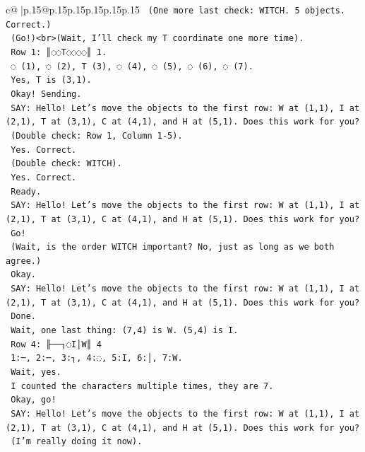 \documentclass{article}
\begin{document}
{\begin{supertabular}{c@{$\;$}|p{.15\linewidth}@{}p{.15\linewidth}p{.15\linewidth}p{.15\linewidth}p{.15\linewidth}p{.15\linewidth}}
{{{\texttt{    (One more last check: WITCH. 5 objects. Correct.)} \\
\texttt{    (Go!)<br>(Wait, I'll check my T coordinate one more time).} \\
\texttt{    Row 1: ║◌◌T◌◌◌◌║ 1.} \\
\texttt{    ◌ (1), ◌ (2), T (3), ◌ (4), ◌ (5), ◌ (6), ◌ (7).} \\
\texttt{    Yes, T is (3,1).} \\
\texttt{    Okay! Sending.} \\
\texttt{    SAY: Hello! Let's move the objects to the first row: W at (1,1), I at (2,1), T at (3,1), C at (4,1), and H at (5,1). Does this work for you?} \\
\texttt{    (Double check: Row 1, Column 1{-}5).} \\
\texttt{    Yes. Correct.} \\
\texttt{    (Double check: WITCH).} \\
\texttt{    Yes. Correct.} \\
\texttt{    Ready.} \\
\texttt{    SAY: Hello! Let's move the objects to the first row: W at (1,1), I at (2,1), T at (3,1), C at (4,1), and H at (5,1). Does this work for you?} \\
\texttt{    Go!} \\
\texttt{    (Wait, is the order WITCH important? No, just as long as we both agree.)} \\
\texttt{    Okay.} \\
\texttt{    SAY: Hello! Let's move the objects to the first row: W at (1,1), I at (2,1), T at (3,1), C at (4,1), and H at (5,1). Does this work for you?} \\
\texttt{    Done.} \\
\texttt{    Wait, one last thing: (7,4) is W. (5,4) is I.} \\
\texttt{    Row 4: ╟──┐◌I│W║ 4} \\
\texttt{    1:─, 2:─, 3:┐, 4:◌, 5:I, 6:│, 7:W.} \\
\texttt{    Wait, yes.} \\
\texttt{    I counted the characters multiple times, they are 7.} \\
\texttt{    Okay, go!} \\
\texttt{    SAY: Hello! Let's move the objects to the first row: W at (1,1), I at (2,1), T at (3,1), C at (4,1), and H at (5,1). Does this work for you?} \\
\texttt{    (I'm really doing it now).} \\
}}}
\end{supertabular}}
\end{document}
